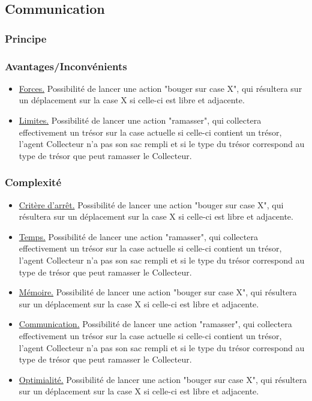 \documentclass[a4paper, 10pt]{article}
\begin{document}
\subsection{Communication}

\subsubsection{Principe}

\blindtext

\subsubsection{Avantages/Inconvénients}

\begin{itemize}
            \item \underline{Forces.} Possibilité de lancer une action "bouger sur case X", qui résultera sur un déplacement sur la case {X} si celle-ci est libre et adjacente.
            \item \underline{Limites.} Possibilité de lancer une action "ramasser", qui collectera effectivement un trésor sur la case actuelle si celle-ci contient un trésor, l'agent Collecteur n'a pas son sac rempli et si le type du trésor correspond au type de trésor que peut ramasser le Collecteur.
\end{itemize}


\subsubsection{Complexité}

\begin{itemize}
            \item \underline{Critère d'arrêt.} Possibilité de lancer une action "bouger sur case X", qui résultera sur un déplacement sur la case {X} si celle-ci est libre et adjacente.
            \item \underline{Temps.} Possibilité de lancer une action "ramasser", qui collectera effectivement un trésor sur la case actuelle si celle-ci contient un trésor, l'agent Collecteur n'a pas son sac rempli et si le type du trésor correspond au type de trésor que peut ramasser le Collecteur.
            \item \underline{Mémoire.} Possibilité de lancer une action "bouger sur case X", qui résultera sur un déplacement sur la case {X} si celle-ci est libre et adjacente.
            \item \underline{Communication.} Possibilité de lancer une action "ramasser", qui collectera effectivement un trésor sur la case actuelle si celle-ci contient un trésor, l'agent Collecteur n'a pas son sac rempli et si le type du trésor correspond au type de trésor que peut ramasser le Collecteur.
            \item \underline{Optimialité.} Possibilité de lancer une action "bouger sur case X", qui résultera sur un déplacement sur la case {X} si celle-ci est libre et adjacente.
\end{itemize}
\end{document}
